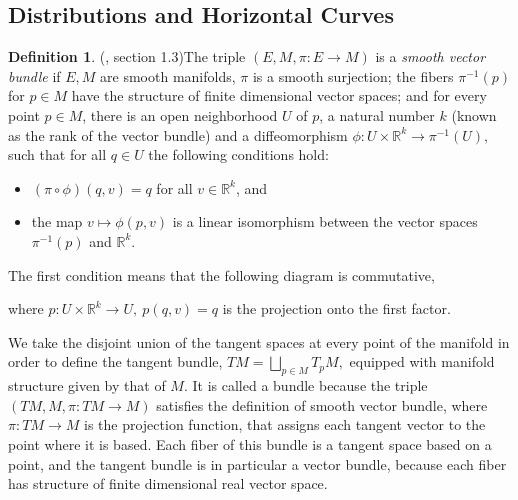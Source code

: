 \documentclass[12pt, letterpaper, reqno]{amsart}
\theoremstyle{definition}
\newtheorem{df}{Definition}
\theoremstyle{plain}
\theoremstyle{remark}
\begin{document}
\subsection{Distributions and Horizontal Curves}%
\label{sub:distributions}

\begin{df}(\cite{luke2013vector}, section 1.3)\label{def:smooth_vector_bundle}
	The triple $ (E, M, \pi: E \rightarrow {M}) $ is a \textit{smooth vector bundle} if $ E,M $ are smooth manifolds, $ \pi $ is a smooth surjection; the fibers $ \pi^{-1}(p) $ for $ p\in M $  have the structure of finite dimensional vector spaces; and for every point $ p\in M $, there is an open neighborhood $ U $ of $ p $, a natural number $ k $ (known as the rank of the vector bundle) and a diffeomorphism $ \phi: U\times \mathbb{R}^k \rightarrow  \pi^{-1}(U),$ such that for all $ q\in U $ the following conditions hold:  

	\begin{itemize}
		\item $ (\pi\circ \phi)(q,v)=q $ for all $ v\in \mathbb{R}^k $, and  
		\item the map $ v \mapsto \phi(p,v) $ is a linear isomorphism between the vector spaces $\pi^{-1}(p) $ and $ \mathbb{R}^k. $     
	\end{itemize}
	The first condition means that the following diagram is commutative,	
	\begin{center}
	\end{center}
	where $ p:U\times \mathbb{R}^k \rightarrow U, \ p(q,v)=q$ is the projection onto the first factor.
\end{df}
We take the disjoint union of the tangent spaces at every point of the manifold in order to define the tangent bundle,
$ TM = \bigsqcup_{p\in M} T_pM, $ 
equipped with manifold structure given by that of $ M. $ It is called a bundle because the triple $ (TM, M,\pi:TM \rightarrow {M}) $ satisfies the definition of smooth vector bundle, where $ \pi:TM \rightarrow {M} $  is the projection function, that assigns each tangent vector to the point where it is based. Each fiber of this bundle is a tangent space based on a point, and the tangent bundle is in particular a vector bundle, because each fiber has structure of finite dimensional real vector space.
\end{document}
